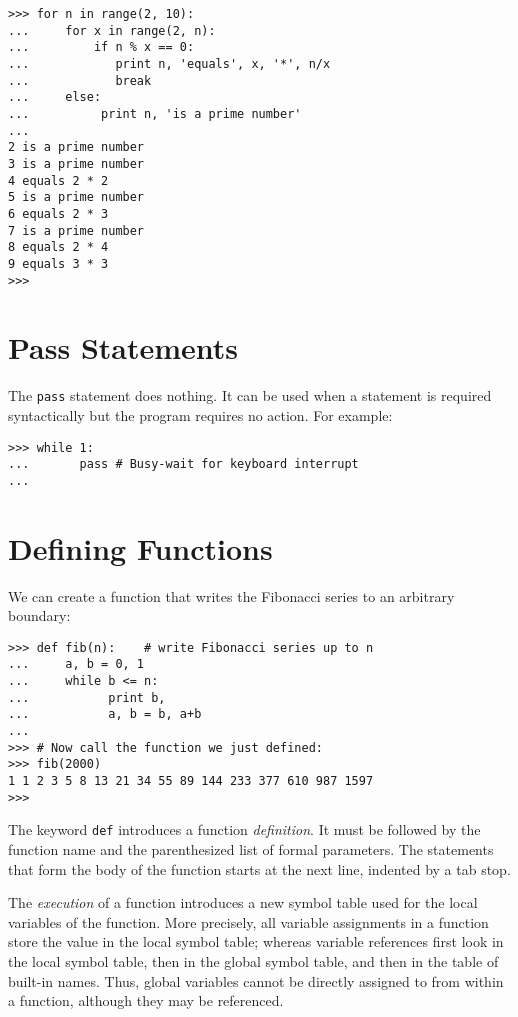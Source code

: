 \bcode\begin{verbatim}
>>> for n in range(2, 10):
...     for x in range(2, n):
...         if n % x == 0:
...            print n, 'equals', x, '*', n/x
...            break
...     else:
...          print n, 'is a prime number'
... 
2 is a prime number
3 is a prime number
4 equals 2 * 2
5 is a prime number
6 equals 2 * 3
7 is a prime number
8 equals 2 * 4
9 equals 3 * 3
>>> 
\end{verbatim}\ecode

\section{Pass Statements}

The {\tt pass} statement does nothing.
It can be used when a statement is required syntactically but the
program requires no action.
For example:

\bcode\begin{verbatim}
>>> while 1:
...       pass # Busy-wait for keyboard interrupt
... 
\end{verbatim}\ecode

\section{Defining Functions}

We can create a function that writes the Fibonacci series to an
arbitrary boundary:

\bcode\begin{verbatim}
>>> def fib(n):    # write Fibonacci series up to n
...     a, b = 0, 1
...     while b <= n:
...           print b,
...           a, b = b, a+b
... 
>>> # Now call the function we just defined:
>>> fib(2000)
1 1 2 3 5 8 13 21 34 55 89 144 233 377 610 987 1597
>>> 
\end{verbatim}\ecode
%
The keyword {\tt def} introduces a function {\em definition}.  It must
be followed by the function name and the parenthesized list of formal
parameters.  The statements that form the body of the function starts at
the next line, indented by a tab stop.

The {\em execution} of a function introduces a new symbol table used
for the local variables of the function.  More precisely, all variable
assignments in a function store the value in the local symbol table;
whereas
 variable references first look in the local symbol table, then
in the global symbol table, and then in the table of built-in names.
Thus,
global variables cannot be directly assigned to from within a
function, although they may be referenced.

